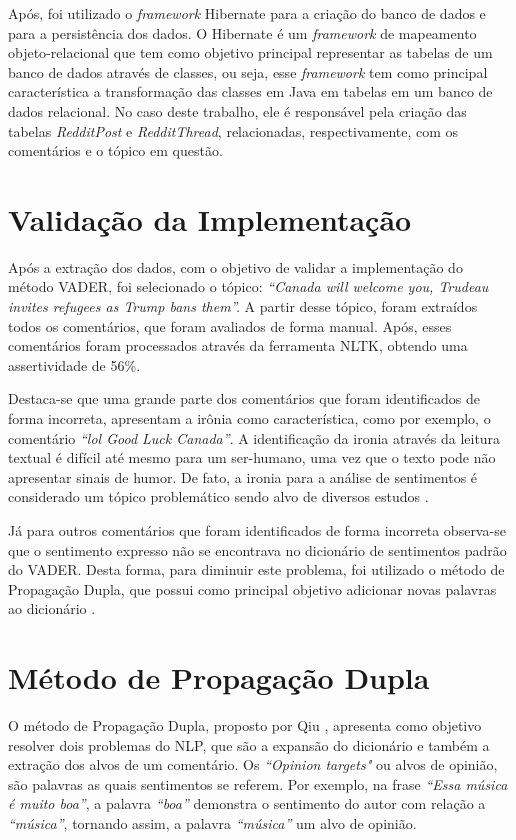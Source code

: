Após, foi utilizado o \textit{framework} Hibernate
\cite{Iverson:2004:HJD:1044870} para a criação do banco de dados e para a
persistência dos dados. O Hibernate é um \textit{framework} de
mapeamento objeto-relacional que tem como objetivo principal representar as
tabelas de um banco de dados através de classes, ou seja, esse \textit{framework} tem como principal
característica a transformação das classes em Java em tabelas em um banco de
dados relacional.
No caso deste trabalho, ele é responsável pela criação das tabelas \textit{RedditPost} e
\textit{RedditThread}, relacionadas, respectivamente, com os comentários e o
tópico em questão. 

\section{Validação da Implementação}

Após a extração dos dados, com o objetivo de validar a implementação
do método \ac{VADER}, foi selecionado o tópico:
\textit{``Canada will welcome you, Trudeau invites refugees as Trump bans
them''.}
A partir desse tópico, foram extraídos todos os comentários, que foram avaliados
de forma manual. Após, esses comentários foram processados através da ferramenta
\ac{NLTK}, obtendo uma assertividade de 56\%.

Destaca-se que uma grande parte dos comentários que foram identificados de forma
incorreta, apresentam a irônia como característica, como por exemplo, o
comentário \textit{``lol Good Luck Canada''}. A identificação da ironia através
da leitura textual é difícil até mesmo para um ser-humano, uma vez que o
texto pode não apresentar sinais de humor. De fato, a ironia para a análise de
sentimentos é considerado um tópico problemático sendo alvo de diversos estudos \cite{DBLP:conf/lrec/StranisciBFP16}.

Já para outros comentários que foram identificados de forma incorreta
observa-se que o sentimento expresso não se encontrava no dicionário de
sentimentos padrão do \ac{VADER}. Desta forma, para diminuir este problema, foi
utilizado o método de Propagação Dupla, que possui como principal objetivo
adicionar novas palavras ao dicionário \cite{Qiu:2011:OWE:1970420.1970422}.

\section{Método de Propagação Dupla}

O método de Propagação Dupla, proposto por Qiu
\cite{Qiu:2011:OWE:1970420.1970422}, apresenta como objetivo resolver dois
problemas do \ac{NLP}, que são a expansão do dicionário e também a extração dos
alvos de um comentário. Os \textit{``Opinion targets"} ou alvos de opinião, são
palavras as quais sentimentos se referem. Por exemplo, na frase \textit{``Essa
música é muito boa''}, a palavra \textit{``boa''} demonstra o sentimento do
autor com relação a \textit{``música''}, tornando assim, a palavra
\textit{``música''} um alvo de opinião.

